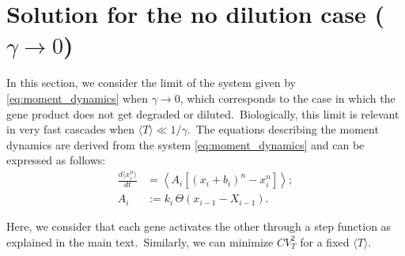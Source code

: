 \documentclass[aps,prb,reprint,superscriptaddress]{revtex4-2}
\begin{document}

\appendix
\section{Solution for the no dilution case ($\gamma\rightarrow0$)}\label{no_dilution_section}

In this section, we consider the limit of the system given by \eqref{eq:moment_dynamics} when ${\gamma\rightarrow0}$, which corresponds to the case in which the gene product does not get degraded or diluted.~Biologically, this limit is relevant in very fast cascades when $\langle T\rangle\ll1/\gamma$.~The equations describing the moment dynamics are derived from the system \eqref{eq:moment_dynamics} and can be expressed as follows:
\begin{subequations}\label{eq:moment_dynamics2}
\begin{align}
\frac{d\langle x_i^n \rangle}{dt} &= \left\langle  A_i \left[(x_i + b_i)^n - x_i^n\right] \right\rangle ;\\[1ex]
A_i &:= k_i\, {\displaystyle \Theta\left( {x_{i-1}- X_{i-1}} \right).~\label{eq:activation_rule2}} 
\end{align}
\end{subequations}

Here, we consider that each gene activates the other through a step function as explained in the main text.~Similarly, we can minimize $CV^2_T$ for a fixed $\langle T\rangle$.
\end{document}
